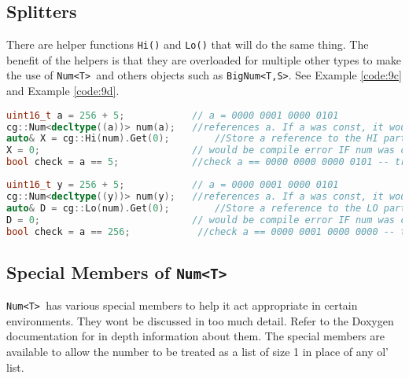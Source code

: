 \documentclass{article}
\newcommand{\theobj}{\protect\Verb+Num<T> +}
\begin{document}
\subsection{Splitters}

There are helper functions \Verb+Hi()+ and \Verb+Lo()+ that will do the same thing.  The benefit of the helpers is that they are overloaded for multiple other types to make the use of \theobj and others objects such as \Verb+BigNum<T,S>+. See Example \vref{code:9c} and Example \vref{code:9d}.

\begin{lstlisting}[language=C++, label=code:9c, caption=Hi members]
uint16_t a = 256 + 5;            // a = 0000 0001 0000 0101
cg::Num<decltype((a))> num(a);   //references a. If a was const, it would be a copy
auto& X = cg::Hi(num).Get(0);        //Store a reference to the HI part of num in X, also references the HI part of a (for this example).  If a was const, it would not reference the Hi part of a, only num
X = 0;                           // would be compile error IF num was const.  If num 
bool check = a == 5;             //check a == 0000 0000 0000 0101 -- true
\end{lstlisting}

\begin{lstlisting}[language=C++, label=code:9d, caption=Lo members]
uint16_t y = 256 + 5;            // a = 0000 0001 0000 0101
cg::Num<decltype((y))> num(y);   //references a. If a was const, it would be a copy
auto& D = cg::Lo(num).Get(0);        //Store a reference to the LO part of num in X, also references the Lo part of a (for this example).  If a was const, it would not reference the Lo part of a, only num
D = 0;                           // would be compile error IF num was const.  If num 
bool check = a == 256;            //check a == 0000 0001 0000 0000 -- true
\end{lstlisting}
\pagebreak
\subsection{Special Members of \theobj}

\theobj has various special members to help it act appropriate in certain environments.  They wont be discussed in too much detail. Refer to the Doxygen documentation for in depth information about them.  The special members are available to allow the number to be treated as a list of size 1 in place of any ol' list.
\end{document}
